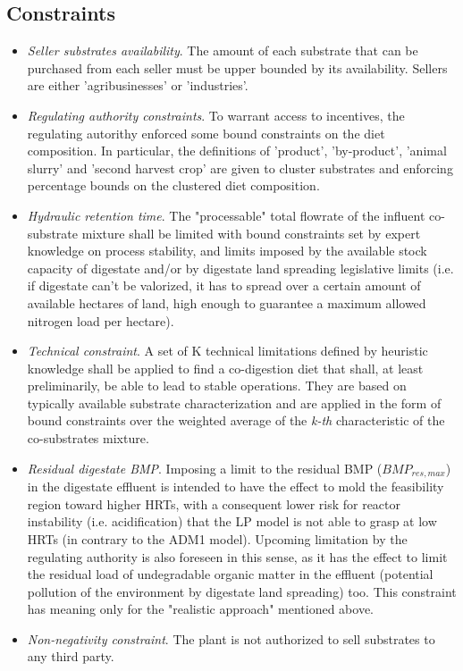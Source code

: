 \subsection{Constraints}
\begin{itemize}
\item \emph{Seller substrates availability}. The amount of each substrate that can be purchased from each seller must be upper bounded by its availability. Sellers are either 'agribusinesses' or 'industries'. 
\item \emph{Regulating authority constraints}. To warrant access to incentives, the regulating autorithy enforced some bound constraints on the diet composition. In particular, the definitions of 'product', 'by-product', 'animal slurry' and 'second harvest crop' are given to cluster substrates and enforcing percentage bounds on the clustered diet composition.
\item \emph{Hydraulic retention time}. The "processable" total flowrate of the influent co-substrate mixture shall be limited with bound constraints set by expert knowledge on process stability, and limits imposed by the available stock capacity of digestate and/or by digestate land spreading legislative limits (i.e. if digestate can't be valorized, it has to spread over a certain amount of available hectares of land, high enough to guarantee a maximum allowed nitrogen load per hectare).
\item \emph{Technical constraint}. A set of K technical limitations defined by heuristic knowledge shall be applied to find a co-digestion diet that shall, at least preliminarily, be able to lead to stable operations. They are based on typically available substrate characterization and are applied in the form of bound constraints over the weighted average of the \emph{k-th} characteristic of the co-substrates mixture.
\item \emph{Residual digestate BMP}. Imposing a limit to the residual BMP ($BMP_{res,max}$) in the digestate effluent is intended to have the effect to mold the feasibility region toward higher HRTs, with a consequent lower risk for reactor instability (i.e. acidification) that the LP model is not able to grasp at low HRTs (in contrary to the ADM1 model). Upcoming limitation by the regulating authority is also foreseen in this sense, as it has the effect to limit the residual load of undegradable organic matter in the effluent (potential pollution of the environment by digestate land spreading) too. This constraint has meaning only for the "realistic approach" mentioned above.
\item \emph{Non-negativity constraint}. The plant is not authorized to sell substrates to any third party.
\end{itemize}
